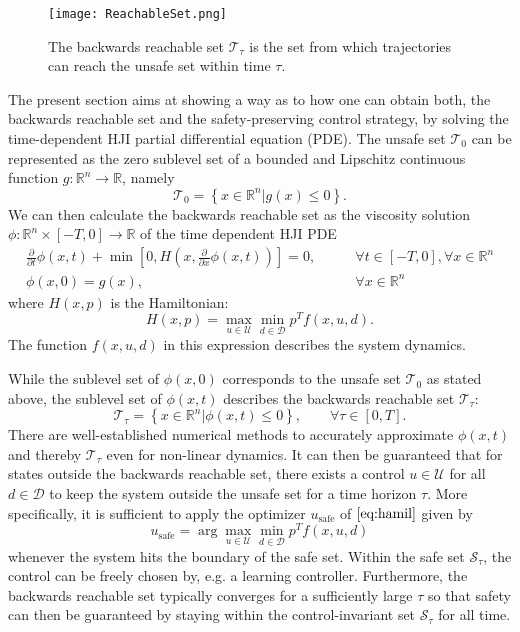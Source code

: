 \documentclass[../main.tex]{subfiles}
\begin{document}
\begin{figure}
    \centering
    \texttt{[image: ReachableSet.png]}
        \caption{The backwards reachable set $\mathcal{T}_\tau$ is the set from which trajectories can reach the unsafe set within time $\tau$.}    
    \label{fig:reachable}
\end{figure}
The present section aims at showing a way as to how one can obtain both, the backwards reachable set and the safety-preserving control strategy, by solving the time-dependent HJI partial differential equation (PDE). The unsafe set $\mathcal{T}_0$ can be represented as the zero sublevel set of a bounded and Lipschitz continuous function $g: \mathbb{R}^n \rightarrow \mathbb{R}$, namely
\begin{equation}
    \mathcal{T}_0 = \left\{ x \in \mathbb{R}^n | g(x) \leq 0 \right \}. 
\end{equation}
We can then calculate the backwards reachable set as the viscosity solution \linebreak \mbox{$\phi: \mathbb{R}^n \times [-T, 0] \rightarrow \mathbb{R}$} of the time dependent HJI PDE
\begin{align}
    \frac{\partial}{\partial t} \phi(x,t) + \min\left[0, H\left(x,\frac{\partial}{\partial x} \phi(x,t)\right)\right] = 0, \qquad &\forall t \in [-T, 0], \forall x \in \mathbb{R}^n\\
    \phi(x,0) = g(x), \qquad &\forall x \in \mathbb{R}^n
\end{align}
where $H(x,p)$ is the Hamiltonian: 
\begin{equation}\label{eq:hamil}
    H(x,p) = \max_{u \in \mathcal{U}} \min_{d \in \mathcal{D}} p^T f(x,u,d).
\end{equation}
The function $f(x,u,d)$ in this expression describes the system dynamics.

While the sublevel set of $\phi(x,0)$ corresponds to the unsafe set $\mathcal{T}_0$ as stated above, the sublevel set of $\phi(x,t)$ describes the backwards reachable set $\mathcal{T}_\tau$:
\begin{equation}
    \mathcal{T}_\tau = \left\{ x \in \mathbb{R}^n | \phi(x,t) \leq 0 \right \}, \qquad \forall \tau \in [0,T].
\end{equation}
There are well-established numerical methods to accurately approximate $\phi(x,t)$ and thereby $\mathcal{T}_\tau$ even for non-linear dynamics. It can then be guaranteed that for states outside the backwards reachable set, there exists a control $u \in \mathcal{U}$ for all $d \in \mathcal{D}$ to keep the system outside the unsafe set for a time horizon $\tau$. More specifically, it is sufficient to apply the optimizer $u_{\text{safe}}$ of $\eqref{eq:hamil}$ given by
\begin{equation}
    u_{\text{safe}} = \arg \max_{u \in \mathcal{U}} \min_{d \in \mathcal{D}} p^T f(x,u,d)
\end{equation}
whenever the system hits the boundary of the safe set. Within the safe set $\mathcal{S}_\tau$, the control can be freely chosen by, e.g. a learning controller. 
Furthermore, the backwards reachable set typically converges for a sufficiently large $\tau$ so that safety can then be guaranteed by staying within the control-invariant set $\mathcal{S}_\tau$ for all time. 
\end{document}
